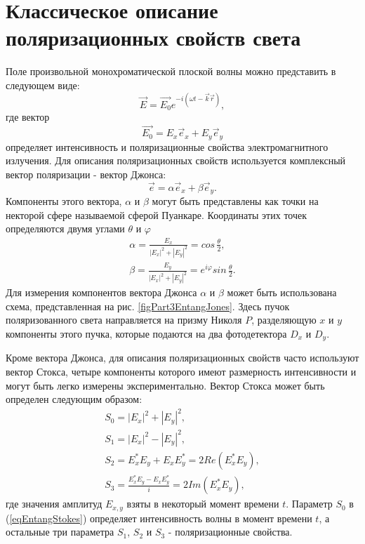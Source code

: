 \section{Классическое описание поляризационных свойств света}
Поле произвольной монохроматической плоской волны можно представить в
следующем виде:
\begin{equation}
\vec{E} = \vec{E_0} e^{-i \left(\omega t - \vec{k}\vec{r}\right)},
\nonumber
\end{equation}
где вектор 
\[
\vec{E_0} = E_{x}\vec{e}_x + E_{y}\vec{e}_y
\]
определяет интенсивность и поляризационные свойства электромагнитного
излучения. Для описания поляризационных свойств используется
комплексный вектор поляризации - вектор Джонса:
\begin{equation}
\vec{e} = \alpha \vec{e}_x + \beta \vec{e}_y.
\label{eqEntangJones}
\end{equation}
Компоненты этого вектора, $\alpha$ и $\beta$ могут быть представлены
как точки на некторой сфере называемой сферой Пуанкаре. Координаты
этих точек определяются двумя углами $\theta$ и $\varphi$
\begin{eqnarray}
\alpha = \frac{E_x}{\left|E_x\right|^2 + \left|E_y\right|^2} = 
 cos \, \frac{\theta}{2},
\nonumber \\
\beta = \frac{E_y}{\left|E_x\right|^2 + \left|E_y\right|^2} = 
 e^{i\varphi} sin \, \frac{\theta}{2}.
\nonumber
\end{eqnarray}
Для измерения компонентов вектора Джонса $\alpha$ и $\beta$ может быть
использована схема, представленная на
рис. \ref{figPart3EntangJones}. Здесь пучок поляризованного света
направляется на призму Николя $P$, разделяющую $x$ и $y$ компоненты
этого пучка, которые подаются на два фотодетектора $D_x$ и $D_y$.



Кроме вектора Джонса, для описания поляризационных свойств часто
используют вектор Стокса, четыре компоненты которого
имеют размерность интенсивности и могут быть легко измерены
экспериментально. Вектор Стокса может быть определен следующим
образом:
\begin{eqnarray}
S_0 = \left|E_x\right|^2 + \left|E_y\right|^2,
\nonumber \\
S_1 = \left|E_x\right|^2 - \left|E_y\right|^2,
\nonumber \\
S_2 = E_x^{*} E_y + E_x E_y^{*} = 2 Re \left(E_x^{*} E_y\right),
\nonumber \\
S_3 = \frac{E_x^{*} E_y - E_x E_y^{*}}{i} = 2 Im \left(E_x^{*}
E_y\right),
\label{eqEntangStokes}
\end{eqnarray}
где значения амплитуд $E_{x,y}$ взяты в некоторый момент времени $t$. 
Параметр $S_0$ в (\ref{eqEntangStokes}) определяет интенсивность волны
в момент времени $t$,
а остальные три параметра $S_1$, $S_2$ и $S_3$ - поляризационные
свойства. 

